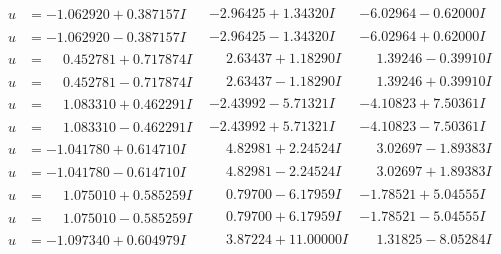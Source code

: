 \documentclass[1p]{elsarticle_modified}
\theoremstyle{definition}
\begin{document}
$$\begin{array}{c|c|c}
\begin{aligned}
u &= -1.062920 + 0.387157 I\end{aligned}
 & -2.96425 + 1.34320 I & -6.02964 - 0.62000 I \\ \hline\begin{aligned}
u &= -1.062920 - 0.387157 I\end{aligned}
 & -2.96425 - 1.34320 I & -6.02964 + 0.62000 I \\ \hline\begin{aligned}
u &= \phantom{-}0.452781 + 0.717874 I\end{aligned}
 & \phantom{-}2.63437 + 1.18290 I & \phantom{-}1.39246 - 0.39910 I \\ \hline\begin{aligned}
u &= \phantom{-}0.452781 - 0.717874 I\end{aligned}
 & \phantom{-}2.63437 - 1.18290 I & \phantom{-}1.39246 + 0.39910 I \\ \hline\begin{aligned}
u &= \phantom{-}1.083310 + 0.462291 I\end{aligned}
 & -2.43992 - 5.71321 I & -4.10823 + 7.50361 I \\ \hline\begin{aligned}
u &= \phantom{-}1.083310 - 0.462291 I\end{aligned}
 & -2.43992 + 5.71321 I & -4.10823 - 7.50361 I \\ \hline\begin{aligned}
u &= -1.041780 + 0.614710 I\end{aligned}
 & \phantom{-}4.82981 + 2.24524 I & \phantom{-}3.02697 - 1.89383 I \\ \hline\begin{aligned}
u &= -1.041780 - 0.614710 I\end{aligned}
 & \phantom{-}4.82981 - 2.24524 I & \phantom{-}3.02697 + 1.89383 I \\ \hline\begin{aligned}
u &= \phantom{-}1.075010 + 0.585259 I\end{aligned}
 & \phantom{-}0.79700 - 6.17959 I & -1.78521 + 5.04555 I \\ \hline\begin{aligned}
u &= \phantom{-}1.075010 - 0.585259 I\end{aligned}
 & \phantom{-}0.79700 + 6.17959 I & -1.78521 - 5.04555 I \\ \hline\begin{aligned}
u &= -1.097340 + 0.604979 I\end{aligned}
 & \phantom{-}3.87224 + 11.00000 I & \phantom{-}1.31825 - 8.05284 I \\ \hline\begin{aligned}

\end{aligned}
\end{array}$$
\end{document}
